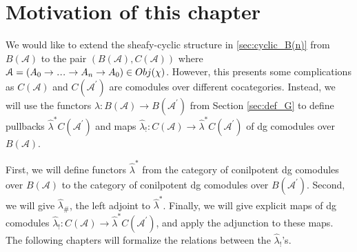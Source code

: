 \section{Motivation of this chapter}
We would like to extend the sheafy-cyclic 
structure in \ref{sec:cyclic_B(n)} from 
$B(\mathcal{A})$ to the pair $(B(\mathcal{A}), 
C(\mathcal{A}))$ where $\mathcal{A} = 
(A_0 \to \smdots \to A_n \to A_0) \in Obj(\chi)$. 
However, this presents some complications 
as $C(\mathcal{A})$ and $C(\mathcal{A^\prime})$ 
are comodules over different 
cocategories. Instead, we will use 
the functors $\hat{\lambda}: B(\mathcal{A}) 
\to B(\mathcal{A}^\prime)$ from Section 
\ref{sec:def_G} to
define pullbacks $\hat{\lambda}^*C(\mathcal{A}^\prime)$ 
and maps $\hat{\lambda}_!: C(\mathcal{A}) 
\to \hat{\lambda}^*C(\mathcal{A}^\prime)$ 
of dg comodules over $B(\mathcal{A})$. 

First, we will define functors $\hat{\lambda}^*$ 
from the category of 
conilpotent dg comodules over $B(\mathcal{A})$ 
to the category of conilpotent dg comodules 
over $B(\mathcal{A}^\prime)$. 
Second, we will give $\hat{\lambda}_\#$, the left adjoint 
to $\hat{\lambda}^*$. Finally, we will 
give explicit maps of dg comodules 
$\hat{\lambda}_!: C(\mathcal{A}) \to 
\hat{\lambda}^*C(\mathcal{A}^\prime)$, 
and apply the adjunction 
to these maps. The following chapters will formalize 
the relations between the $\hat{\lambda}_!$'s.